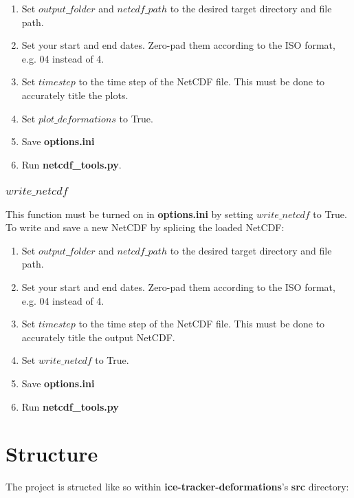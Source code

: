 \documentclass{article}
\begin{document}
            \begin{enumerate}
                \item Set $output\_folder$ and $netcdf\_path$ to the desired target directory and file path.
                \item Set your start and end dates. Zero-pad them according to the ISO format, e.g. 04 instead of 4.
                \item Set $timestep$ to the time step of the NetCDF file. This must be done to accurately title the plots.
                \item Set $plot\_deformations$ to True.
                \item Save \textbf{options.ini}
                \item Run \textbf{netcdf\_tools.py}.
            \end{enumerate}

        \subsubsection*{$write\_netcdf$}

            This function must be turned on in \textbf{options.ini} by setting $write\_netcdf$ to True. To write and save a new NetCDF by splicing the loaded NetCDF:

            \begin{enumerate}
                \item Set $output\_folder$ and $netcdf\_path$ to the desired target directory and file path.
                \item Set your start and end dates. Zero-pad them according to the ISO format, e.g. 04 instead of 4.
                \item Set $timestep$ to the time step of the NetCDF file. This must be done to accurately title the output NetCDF.
                \item Set $write\_netcdf$ to True.
                \item Save \textbf{options.ini}
                \item Run \textbf{netcdf\_tools.py}
            \end{enumerate}

\section{Structure}\label{Structure}

    The project is structed like so within \textbf{ice-tracker-deformations}'s \textbf{src} directory:
\end{document}
